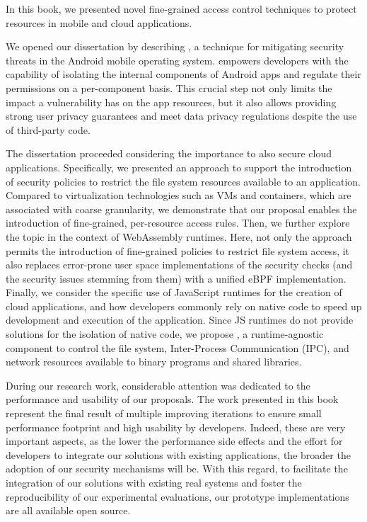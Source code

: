 In this book, we presented novel fine-grained access control
techniques to protect resources in mobile and cloud applications.

We opened our dissertation by describing \seapp, a technique for
mitigating security threats in the Android mobile operating system.
\seapp empowers developers with the capability of isolating the
internal components of Android apps and regulate their permissions on
a per-component basis. This crucial step not only limits the impact a
vulnerability has on the app resources, but it also allows providing
strong user privacy guarantees and meet data privacy regulations
despite the use of third-party code.

The dissertation proceeded considering the importance to also secure
cloud applications. Specifically, we presented an approach to support
the introduction of security policies to restrict the file system
resources available to an application. Compared to virtualization
technologies such as VMs and containers, which are associated with
coarse granularity, we demonstrate that our proposal enables the
introduction of fine-grained, per-resource access rules. Then, we
further explore the topic in the context of WebAssembly runtimes.
Here, not only the approach permits the introduction of fine-grained
policies to restrict file system access, it also replaces error-prone
user space implementations of the security checks (and the security
issues stemming from them) with a unified eBPF implementation.
Finally, we consider the specific use of JavaScript runtimes for the
creation of cloud applications, and how developers commonly rely on
native code to speed up development and execution of the application.
Since JS runtimes do not provide solutions for the isolation of native
code, we propose \natisand, a runtime-agnostic component to control
the file system, Inter-Process Communication (IPC), and network
resources available to binary programs and shared libraries.

During our research work, considerable attention was dedicated to the
performance and usability of our proposals. The work presented in this
book represent the final result of multiple improving iterations to
ensure small performance footprint and high usability by developers.
Indeed, these are very important aspects, as the lower the performance
side effects and the effort for developers to integrate our solutions
with existing applications, the broader the adoption of our security
mechanisms will be. With this regard, to
facilitate the integration of our solutions with existing real systems
and foster the reproducibility of our experimental evaluations, our
prototype implementations are all available open source.

